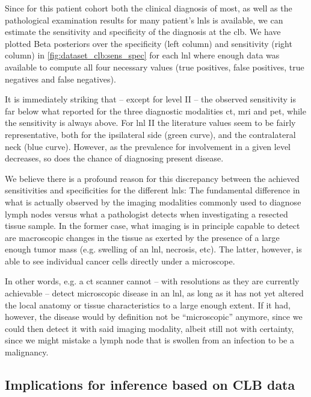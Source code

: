 \documentclass[\relativeRoot/main.tex]{subfiles}
\begin{document}
Since for this patient cohort both the clinical diagnosis of most, as well as the pathological examination results for many patient's \glspl{lnl} is available, we can estimate the sensitivity and specificity of the diagnosis at the \gls{clb}. We have plotted Beta posteriors over the specificity (left column) and sensitivity (right column) in \cref{fig:dataset_clb:sens_spec} for each \gls{lnl} where enough data was available to compute all four necessary values (true positives, false positives, true negatives and false negatives).

It is immediately striking that -- except for level II -- the observed sensitivity is far below what  reported for the three diagnostic modalities \gls{ct}, \gls{mri} and \gls{pet}, while the sensitivity is always above. For \gls{lnl} II the literature values seem to be fairly representative, both for the ipsilateral side (green curve), and the contralateral neck (blue curve). However, as the prevalence for involvement in a given level decreases, so does the chance of diagnosing present disease.

We believe there is a profound reason for this discrepancy between the achieved sensitivities and specificities for the different \glspl{lnl}: The fundamental difference in what is actually observed by the imaging modalities commonly used to diagnose lymph nodes versus what a pathologist detects when investigating a resected tissue sample. In the former case, what imaging is in principle capable to detect are macroscopic changes in the tissue as exerted by the presence of a large enough tumor mass (e.g. swelling of an \gls{lnl}, necrosis, etc). The latter, however, is able to see individual cancer cells directly under a microscope.

In other words, e.g. a \gls{ct} scanner cannot -- with resolutions as they are currently achievable -- detect microscopic disease in an \gls{lnl}, as long as it has not yet altered the local anatomy or tissue characteristics to a large enough extent. If it had, however, the disease would by definition not be ``microscopic'' anymore, since we could then detect it with said imaging modality, albeit still not with certainty, since we might mistake a lymph node that is swollen from an infection to be a malignancy.

\subsection{Implications for inference based on CLB data}
\label{subsec:dataset_clb:results:implications}
\end{document}
